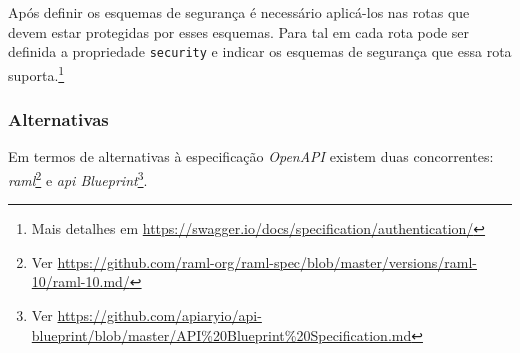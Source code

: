 Após definir os esquemas de segurança é necessário aplicá-los nas rotas que devem estar protegidas por esses esquemas. Para tal em cada rota pode ser definida a propriedade \texttt{security} e indicar os esquemas de segurança que essa rota suporta.\footnote{Mais detalhes em \url{https://swagger.io/docs/specification/authentication/}}

\subsubsection{Alternativas}
Em termos de alternativas à especificação \textit{OpenAPI} existem duas concorrentes: \textit{\acrshort{raml}}\footnote{Ver \url{https://github.com/raml-org/raml-spec/blob/master/versions/raml-10/raml-10.md/}} e \textit{\acrshort{api} Blueprint}\footnote{Ver \url{https://github.com/apiaryio/api-blueprint/blob/master/API\%20Blueprint\%20Specification.md}}.

